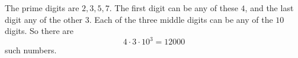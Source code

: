 The prime digits are $2,3,5,7$. The first digit can be any of these $4$, and the last digit any of the other $3$. Each of the three middle digits can be any of the $10$ digits. So there are
\[
4\cdot3\cdot10^3=\boxed{12000}
\]
such numbers.
